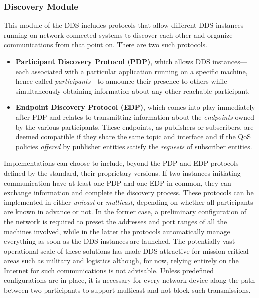 \subsubsection{Discovery Module}
\label{sec:dds_discovery}
This module of the DDS includes protocols that allow different DDS instances running on network-connected systems to discover each other and organize communications from that point on. There are two such protocols.
\begin{itemize}
  \item \textbf{Participant Discovery Protocol (PDP)}, which allows DDS instances—each associated with a particular application running on a specific machine, hence called \emph{participants}—to announce their presence to others while simultaneously obtaining information about any other reachable participant.
  \item \textbf{Endpoint Discovery Protocol (EDP)}, which comes into play immediately after PDP and relates to transmitting information about the \emph{endpoints} owned by the various participants. These endpoints, as publishers or subscribers, are deemed compatible if they share the same topic and interface and if the QoS policies \emph{offered} by publisher entities satisfy the \emph{requests} of subscriber entities.
\end{itemize}
Implementations can choose to include, beyond the PDP and EDP protocols defined by the standard, their proprietary versions. If two instances initiating communication have at least one PDP and one EDP in common, they can exchange information and complete the discovery process. These protocols can be implemented in either \emph{unicast} or \emph{multicast}, depending on whether all participants are known in advance or not. In the former case, a preliminary configuration of the network is required to preset the addresses and port ranges of all the machines involved, while in the latter the protocols automatically manage everything as soon as the DDS instances are launched. The potentially vast operational scale of these solutions has made DDS attractive for mission-critical areas such as military and logistics although, for now, relying entirely on the Internet for such communications is not advisable. Unless predefined configurations are in place, it is necessary for every network device along the path between two participants to support multicast and not block such transmissions.


